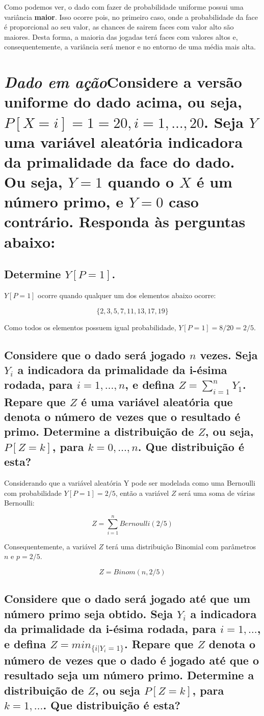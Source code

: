 \documentclass[a4paper]{article}
\begin{document}
Como podemos ver, o dado com fazer de probabilidade uniforme possui uma variância \textbf{maior}. Isso ocorre pois, no primeiro caso, onde a probabilidade da face é proporcional ao seu valor, as chances de sairem faces com valor alto são maiores. Desta forma, a maioria das jogadas terá faces com valores altos e, consequentemente, a variância será menor e no entorno de uma média mais alta. 


\section{\textit{Dado em ação}Considere a versão uniforme do dado acima, ou seja, $P[X = i] = 1=20, i = 1, \ldots, 20$. Seja $Y$ uma variável aleatória indicadora da primalidade da face do dado. Ou seja, $Y = 1$ quando o $X$ é um número primo, e $Y = 0$ caso contrário. Responda às perguntas abaixo:}

\subsection{Determine $Y[P = 1]$.}

$Y[P = 1]$ ocorre quando qualquer um dos elementos abaixo ocorre: 

$$\{2, 3, 5, 7, 11, 13, 17, 19\}$$

Como todos os elementos possuem igual probabilidade, $Y[P = 1] = 8/20 = 2/5$.

\subsection{Considere que o dado será jogado $n$ vezes. Seja $Y_i$ a indicadora da primalidade da i-ésima rodada, para $i = 1, \ldots, n$, e defina $Z = \sum_{i=1}^n Y_1$. Repare que $Z$ é uma variável aleatória que denota o número de vezes que o resultado é primo. Determine a distribuição de $Z$, ou seja, $P[Z = k]$, para $k = 0, \ldots, n$. Que distribuição é esta?}

Considerando que a variável aleatória Y pode ser modelada como uma Bernoulli com probabilidade $Y[P = 1] = 2/5$, então a variável $Z$ será uma soma de várias Bernoulli: 

$$Z = \sum_{i = 1}^n Bernoulli(2/5)$$

Consequentemente, a variável $Z$ terá uma distribuição Binomial com parâmetros $n$ e $p = 2/5$.

$$Z = Binom(n, 2/5)$$

\subsection{Considere que o dado será jogado até que um número primo seja obtido. Seja $Y_i$ a indicadora da primalidade da i-ésima rodada, para $i = 1, \ldots$, e defina $Z = min_{\{i|Y_i = 1\}}$. Repare que $Z$ denota o número de vezes que o dado é jogado até que o resultado seja um número primo. Determine a distribuição de $Z$, ou seja $P[Z = k]$, para $k = 1, \ldots$. Que distribuição é esta?}
\end{document}
